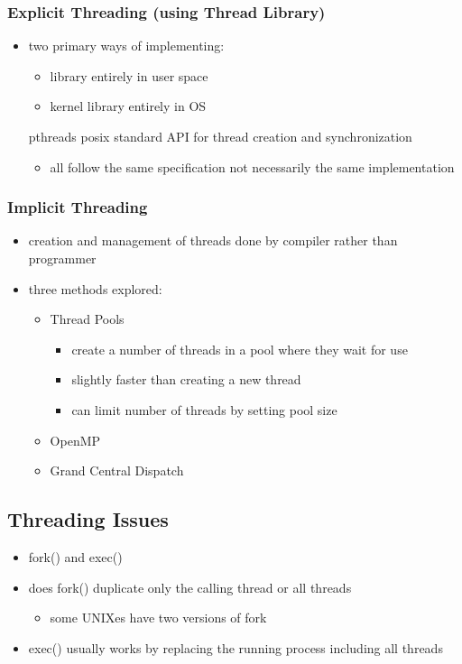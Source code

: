 \documentclass[11pt]{article}
\begin{document}
\subsubsection{Explicit Threading (using Thread Library)}
\label{sec:orgf037ee8}
\begin{itemize}
\item two primary ways of implementing:
\begin{itemize}
\item library entirely in user space
\item kernel library entirely in OS
\end{itemize}
\item[{pthreads}] posix standard API for thread creation and synchronization
\begin{itemize}
\item all follow the same specification not necessarily the same implementation
\end{itemize}
\end{itemize}
\subsubsection{Implicit Threading}
\label{sec:org6f25d14}
\begin{itemize}
\item creation and management of threads done by compiler rather than programmer
\item three methods explored:
\begin{itemize}
\item Thread Pools
\begin{itemize}
\item create a number of threads in a pool where they wait for use
\item slightly faster than creating a new thread
\item can limit number of threads by setting pool size
\end{itemize}
\item OpenMP
\item Grand Central Dispatch
\end{itemize}
\end{itemize}
\subsection{Threading Issues}
\label{sec:org0b2a017}
\begin{itemize}
\item fork() and exec()
\item does fork() duplicate only the calling thread or all threads
\begin{itemize}
\item some UNIXes have two versions of fork
\end{itemize}
\item exec() usually works by replacing the running process including all threads
\end{itemize}
\end{document}
